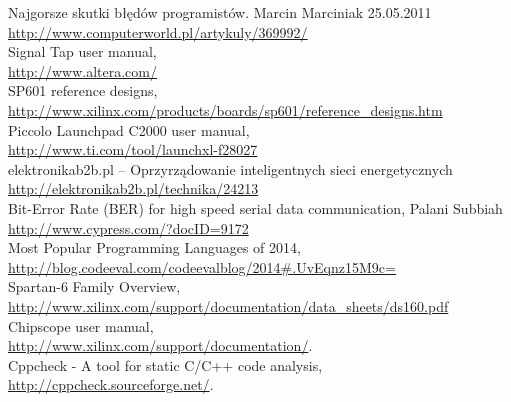 \begin{thebibliography}{99}
 Najgorsze skutki błędów programistów. Marcin Marciniak 25.05.2011 \\
		\url{http://www.computerworld.pl/artykuly/369992/} \\						
 Signal Tap user manual, \\
	\url{http://www.altera.com/} \\ 
 SP601 reference designs, \\
	\url{http://www.xilinx.com/products/boards/sp601/reference_designs.htm} \\
 Piccolo Launchpad C2000 user manual, \\
	\url{http://www.ti.com/tool/launchxl-f28027}\\ 
 elektronikab2b.pl -- Oprzyrządowanie inteligentnych sieci energetycznych\\
	\url{http://elektronikab2b.pl/technika/24213} \\ 
Bit-Error Rate (BER) for high speed serial data communication, Palani Subbiah \\
	\url{http://www.cypress.com/?docID=9172} \\
  Most Popular Programming Languages of 2014, \\
	\url{http://blog.codeeval.com/codeevalblog/2014#.UvEqnz15M9c=} \\
 Spartan-6 Family Overview, \\
	\url{http://www.xilinx.com/support/documentation/data_sheets/ds160.pdf} \\
 Chipscope user manual, \\
	\url{http://www.xilinx.com/support/documentation/}. \\
 Cppcheck - A tool for static C/C++ code analysis, \\
	\url{http://cppcheck.sourceforge.net/}.
	
\end{thebibliography}

